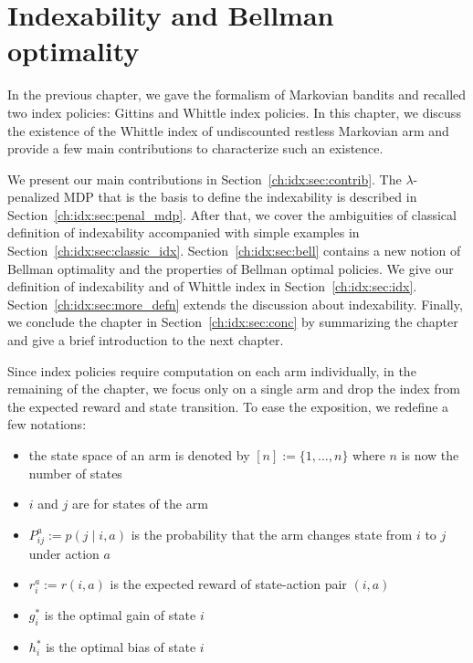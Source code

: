 \begingroup

\let\clearpage\relax

\chapter{Indexability and Bellman optimality }
\label{ch:indexability}

In the previous chapter, we gave the formalism of Markovian bandits and recalled two index policies: Gittins and Whittle index policies.
In this chapter, we discuss the existence of the Whittle index of undiscounted restless Markovian arm and provide a few main contributions to characterize such an existence.

We present our main contributions in Section~\ref{ch:idx:sec:contrib}. The $\lambda$-penalized MDP that is the basis to define the indexability is described in Section~\ref{ch:idx:sec:penal_mdp}.
After that, we cover the ambiguities of classical definition of indexability accompanied with simple examples in Section~\ref{ch:idx:sec:classic_idx}.
Section~\ref{ch:idx:sec:bell} contains a new notion of Bellman optimality and the properties of Bellman optimal policies.
We give our definition of indexability and of Whittle index in Section~\ref{ch:idx:sec:idx}.
Section~\ref{ch:idx:sec:more_defn} extends the discussion about indexability.
Finally, we conclude the chapter in Section~\ref{ch:idx:sec:conc} by summarizing the chapter and give a brief introduction to the next chapter.


Since index policies require computation on each arm individually,  in the remaining of the chapter, we focus only on a single arm and drop the index from the expected reward and state transition.
To ease the exposition, we redefine a few notations:
\begin{itemize}
    \item the state space of an arm is denoted by $[n]:=\{1,\dots,n\}$ where $n$ is now the number of states
    \item $i$ and $j$ are for states of the arm
    \item $P^a_{ij}:=p(j\mid i,a)$ is the probability that the arm changes state from $i$ to $j$ under action $a$
    \item $r^a_i:=r(i,a)$ is the expected reward of state-action pair $(i,a)$
    \item $g^*_i$ is the optimal gain of state $i$
    \item $h^*_i$ is the optimal bias of state $i$ 
\end{itemize}

